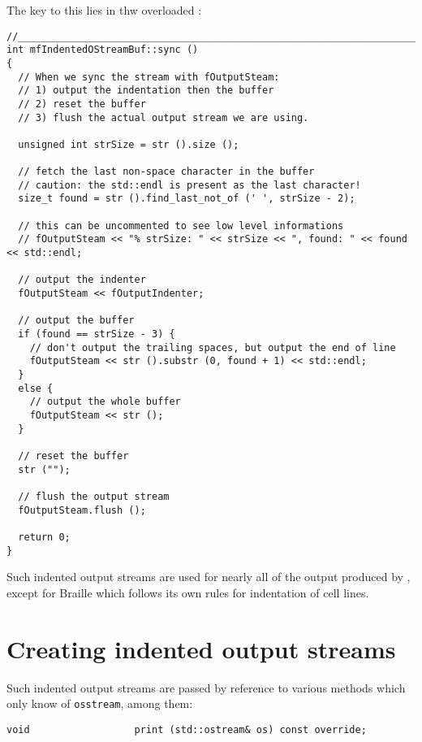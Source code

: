 The key to this lies in thw overloaded :
\begin{lstlisting}[language=CPlusPlus]
//______________________________________________________________________________
int mfIndentedOStreamBuf::sync ()
{
  // When we sync the stream with fOutputSteam:
  // 1) output the indentation then the buffer
  // 2) reset the buffer
  // 3) flush the actual output stream we are using.

  unsigned int strSize = str ().size ();

  // fetch the last non-space character in the buffer
  // caution: the std::endl is present as the last character!
  size_t found = str ().find_last_not_of (' ', strSize - 2);

  // this can be uncommented to see low level informations
  // fOutputSteam << "% strSize: " << strSize << ", found: " << found << std::endl;

  // output the indenter
  fOutputSteam << fOutputIndenter;

  // output the buffer
  if (found == strSize - 3) {
    // don't output the trailing spaces, but output the end of line
    fOutputSteam << str ().substr (0, found + 1) << std::endl;
  }
  else {
    // output the whole buffer
    fOutputSteam << str ();
  }

  // reset the buffer
  str ("");

  // flush the output stream
  fOutputSteam.flush ();

  return 0;
}
\end{lstlisting}

Such indented output streams are used for nearly all of the output produced by \mf, except for Braille which follows its own rules for indentation of cell lines.


\section{Creating indented output streams}

Such indented output streams are passed by reference to various methods which only know of {\tt osstream}, among them:
\begin{lstlisting}[language=CPlusPlus]
    void                  print (std::ostream& os) const override;
\end{lstlisting}


